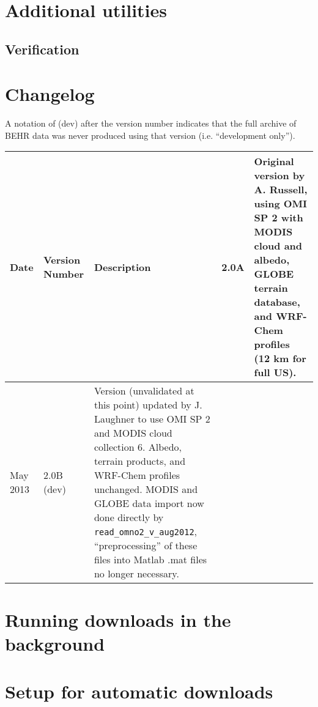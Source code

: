 \documentclass[12pt]{article}
\begin{document}
	

	
\section{Additional utilities}
	\subsection{Verification}


\newpage
\appendix
\appendixpage
\addappheadtotoc
	
\section{Changelog}
	A notation of (dev) after the version number indicates that the full archive of BEHR data was never produced using that version (i.e. ``development only'').

\bgroup
\def\arraystretch{1.5}
	\begin{table}[h]
		\begin{longtabu} to \textwidth{| l | l | X |} \hline
			Date 		& 	Version Number		&	Description \endhead {}		&	2.0A				&	Original version by A. Russell, using OMI SP 2 with MODIS cloud and albedo, GLOBE terrain database, and WRF-Chem profiles (12 km for full US). \\ \hline
			May 2013	&	2.0B	 (dev)		&	Version (unvalidated at this point) updated by J. Laughner to use OMI SP 2 and MODIS cloud collection 6.  Albedo, terrain products, and WRF-Chem profiles unchanged.  MODIS and GLOBE data import now done directly by \texttt{read\_omno2\_v\_aug2012}, ``preprocessing'' of these files into Matlab .mat files no longer necessary. \\ \hline
		\end{longtabu}
	\end{table}
\egroup

\section{Running downloads in the background}

\section{Setup for automatic downloads} \label{app:autodl}
\end{document}
